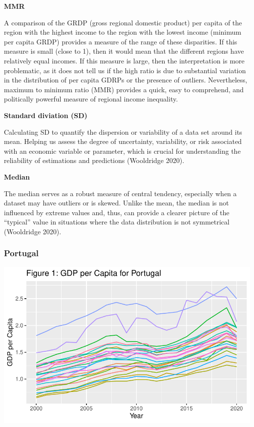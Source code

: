 \documentclass[
  a4paper,
  DIV=11,
  numbers=noendperiod]{scrartcl}
\begin{document}
\textbf{MMR}

A comparison of the GRDP (gross regional domestic product) per capita of
the region with the highest income to the region with the lowest income
(minimum per capita GRDP) provides a measure of the range of these
disparities. If this measure is small (close to 1), then it would mean
that the different regions have relatively equal incomes. If this
measure is large, then the interpretation is more problematic, as it
does not tell us if the high ratio is due to substantial variation in
the distribution of per capita GDRPs or the presence of outliers.
Nevertheless, maximum to minimum ratio (MMR) provides a quick, easy to
comprehend, and politically powerful measure of regional income
inequality.

\textbf{Standard diviation (SD)}

Calculating SD to quantify the dispersion or variability of a data set
around its mean. Helping us assess the degree of uncertainty,
variability, or risk associated with an economic variable or parameter,
which is crucial for understanding the reliability of estimations and
predictions (Wooldridge 2020).

\textbf{Median}

The median serves as a robust measure of central tendency, especially
when a dataset may have outliers or is skewed. Unlike the mean, the
median is not influenced by extreme values and, thus, can provide a
clearer picture of the ``typical'' value in situations where the data
distribution is not symmetrical (Wooldridge 2020).

\hypertarget{portugal}{%
\subsubsection{Portugal}\label{portugal}}

\includegraphics{assignment_1_files/figure-pdf/unnamed-chunk-7-1.pdf}
\end{document}
